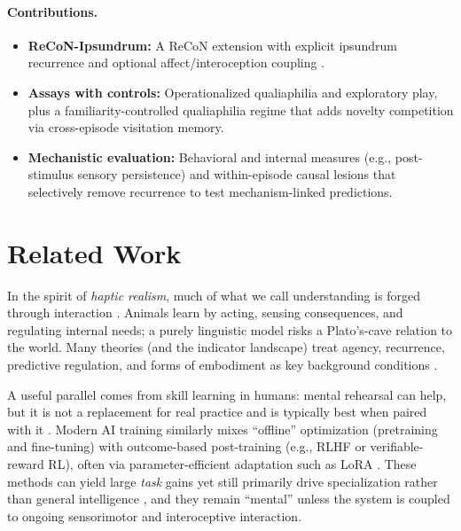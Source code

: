 \documentclass[letterpaper]{article} %
\begin{document}
\paragraph{Contributions.}
\begin{itemize}
\item \textbf{ReCoN-Ipsundrum:} A ReCoN extension with explicit ipsundrum recurrence and optional affect/interoception coupling \citep{BachHerger2015ReCoN,Humphrey2023Sentience,Barrett2017HowEmotions}.
\item \textbf{Assays with controls:} Operationalized qualiaphilia and exploratory play, plus a familiarity-controlled qualiaphilia regime that adds novelty competition via cross-episode visitation memory.
\item \textbf{Mechanistic evaluation:} Behavioral and internal measures (e.g., post-stimulus sensory persistence) and within-episode causal lesions that selectively remove recurrence to test mechanism-linked predictions.
\end{itemize}

\section{Related Work}
In the spirit of \emph{haptic realism}, much of what we call understanding is forged through interaction \citep{Chirimuuta2024BrainAbstracted,Chang2022Realism}.
Animals learn by acting, sensing consequences, and regulating internal needs; a purely linguistic model risks a Plato's-cave relation to the world.
Many theories (and the indicator landscape) treat agency, recurrence, predictive regulation, and forms of embodiment as key background conditions \citep{ButlinEtAl2025Indicators}.

A useful parallel comes from skill learning in humans: mental rehearsal can help, but it is not a replacement for real practice and is typically best when paired with it \citep{SchusterEtAl2011BestPracticeMI,LaddaEtAl2021MotorImageryReview}.
Modern AI training similarly mixes ``offline'' optimization (pretraining and fine-tuning) with outcome-based post-training (e.g., RLHF or verifiable-reward RL), often via parameter-efficient adaptation such as LoRA \citep{OuyangEtAl2022InstructGPT,ShaoEtAl2024DeepSeekMath,HuEtAl2021LoRA}.
These methods can yield large \emph{task} gains yet still primarily drive specialization rather than general intelligence \citep{Schulman2025LoRAWithoutRegret}, and they remain ``mental'' unless the system is coupled to ongoing sensorimotor and interoceptive interaction.
\end{document}
